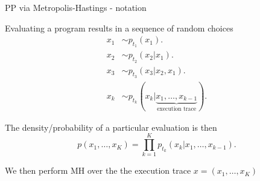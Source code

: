 \begin{frame}{PP via Metropolis-Hastings - notation}
  \begin{block}{}
    Evaluating a program results in a sequence of random choices
    \begin{align*}
          x_1 & \sim p_{t_1}( x_1 ).\\
          x_2 & \sim p_{t_2}( x_2 |x_1).\\
          x_3 & \sim p_{t_3}( x_3 |x_2,x_1).\\
	      x_k & \sim p_{t_k}( x_k | \underbrace{x_1,\ldots,x_{k-1}}_{\textrm{execution trace}}).
    \end{align*}
    
    The density/probability of a particular evaluation is then
    \begin{equation*}
      p(x_1,\ldots,x_K) = \prod_{k=1}^K p_{t_k}(x_k|x_1,\ldots,x_{k-1}).
    \end{equation*}
    
    We then perform MH over the the execution trace $x = (x_1,\ldots,x_K)$%
    
  \end{block}
\end{frame}

